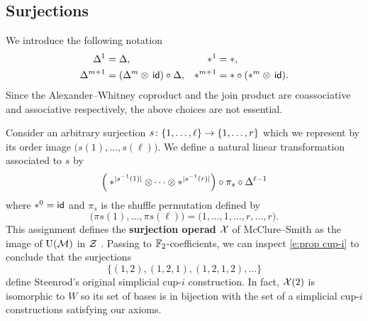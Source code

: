 
\subsection{Surjections}

We introduce the following notation
\begin{align*}
	\Delta^1 &= \Delta, &
	\ast^1 &= \ast, \\
	\Delta^{m+1} &= (\Delta^m \otimes \, \mathsf{id}) \circ \Delta, &
	\ast^{m+1} &= \ast \circ (\ast^m \otimes \, \mathsf{id}).
\end{align*}
Since the Alexander--Whitney coproduct and the join product are coassociative and associative respectively, the above choices are not essential.

Consider an arbitrary surjection $s \colon \{1,\dots,\ell\} \to \{1,\dots,r\}$ which we represent by its order image $\big(s(1),\dots,s(\ell)\big)$.
We define a natural linear transformation associated to $s$ by
\begin{equation}\label{e:surjection action}
	\Big( \ast^{\lvert s^{-1}(1)\rvert} \otimes \dotsb \otimes \ast^{\lvert s^{-1}(r)\rvert} \Big) \circ \pi_s \circ \Delta^{\ell-1}
\end{equation}
where $\ast^0 = \mathsf{id}$ and $\pi_s$ is the shuffle permutation defined by
\[
\big( \pi s(1), \dots, \pi s(\ell) \big) =
\big( 1, \dots, 1, \dots, r, \dots, r \big).
\]
This assignment defines the \textbf{surjection operad} $\mathcal{X}$ of McClure--Smith \cite{mcclure2003multivariable} as the image of $\operatorname{U}(\mathcal{M})$ in $\mathcal{Z}$ \cite[Appendix 1]{medina2020prop1}.
Passing to ${\mathbb{F}_2}$-coefficients, we can inspect \cref{e:prop cup-i} to conclude that the surjections
\[
\big\{ (1,2), (1,2,1), (1,2,1,2), \dots \big\}
\]
define Steenrod's original simplicial \mbox{cup-$i$} construction.
In fact, $\mathcal{X}(2)$ is isomorphic to $W$ so its set of bases is in bijection with the set of a simplicial \mbox{cup-$i$} constructions satisfying our axioms.

